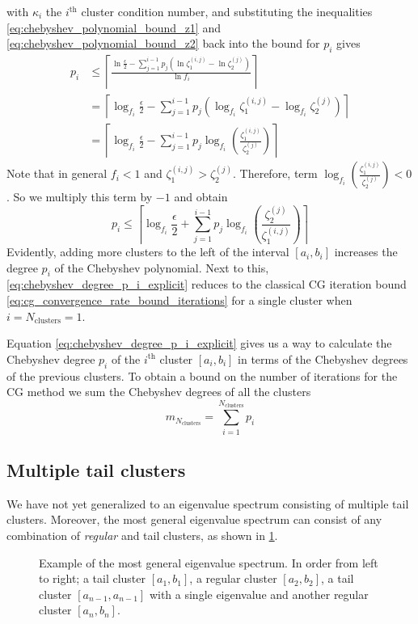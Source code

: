 with $\kappa_i$ the $i^{\text{th}}$ cluster condition number, and substituting the inequalities \ref{eq:chebyshev_polynomial_bound_z1} and \ref{eq:chebyshev_polynomial_bound_z2} back into the bound for $p_i$ gives
\begin{align*}
    p_i & \leq \left\lceil\frac{\ln{\frac{\epsilon}{2}} - \sum_{j=1}^{i-1} p_j\left(\ln{\zeta^{(i,j)}_1} - \ln{\zeta^{(j)}_2} \right)}{\ln{f_i}}\right\rceil  \\
        & = \left\lceil\log_{f_i}{\frac{\epsilon}{2}} - \sum_{j=1}^{i-1} p_j\left(\log_{f_i}{\zeta^{(i,j)}_1} - \log_{f_i}{\zeta^{(j)}_2} \right)\right\rceil \\
        & = \left\lceil\log_{f_i}{\frac{\epsilon}{2}} - \sum_{j=1}^{i-1} p_j\log_{f_i}\left(\frac{\zeta^{(i,j)}_1}{\zeta^{(j)}_2}\right)\right\rceil
\end{align*}
Note that in general $f_i < 1$ and $\zeta^{(i,j)}_1 > \zeta^{(j)}_2$. Therefore, term $\log_{f_i}{\left(\frac{\zeta^{(i,j)}_1}{\zeta^{(j)}_2}\right)} < 0$. So we multiply this term by $-1$ and obtain
\begin{equation}
    p_i \leq \left\lceil\log_{f_i}{\frac{\epsilon}{2}} + \sum_{j=1}^{i-1} p_j\log_{f_i}\left(\frac{\zeta^{(j)}_2}{\zeta^{(i,j)}_1}\right)\right\rceil
    \label{eq:chebyshev_degree_p_i_explicit}
\end{equation}
Evidently, adding more clusters to the left of the interval $[a_i,b_i]$ increases the degree $p_i$ of the Chebyshev polynomial. Next to this, \cref{eq:chebyshev_degree_p_i_explicit} reduces to the classical CG iteration bound \cref{eq:cg_convergence_rate_bound_iterations} for a single cluster when $i = N_{\text{clusters}} = 1$.

Equation \ref{eq:chebyshev_degree_p_i_explicit} gives us a way to calculate the Chebyshev degree $p_i$ of the $i^{\text{th}}$ cluster $[a_i,b_i]$ in terms of the Chebyshev degrees of the previous clusters. To obtain a bound on the number of iterations for the CG method we sum the Chebyshev degrees of all the clusters
\begin{equation}
    m_{N_{\text{clusters}}} = \sum_{i=1}^{N_{\text{clusters}}} p_i
    \label{eq:cg_iteration_bound_multiple_clusters}
\end{equation}

\subsection{Multiple tail clusters}\label{sec:cg_single_eigenvalue_tail_clusters}
We have not yet generalized to an eigenvalue spectrum consisting of multiple tail clusters. Moreover, the most general eigenvalue spectrum can consist of any combination of \textit{regular} and tail clusters, as shown in \cref{fig:general_spectrum}.
\begin{figure}[H]
    \centering
    
    \caption{Example of the most general eigenvalue spectrum. In order from left to right; a tail cluster $[a_1, b_1]$, a regular cluster $[a_2, b_2]$, a tail cluster $[a_{n-1}, a_{n-1}]$ with a single eigenvalue and another regular cluster $[a_n, b_n]$.}
    \label{fig:general_spectrum}
\end{figure}

